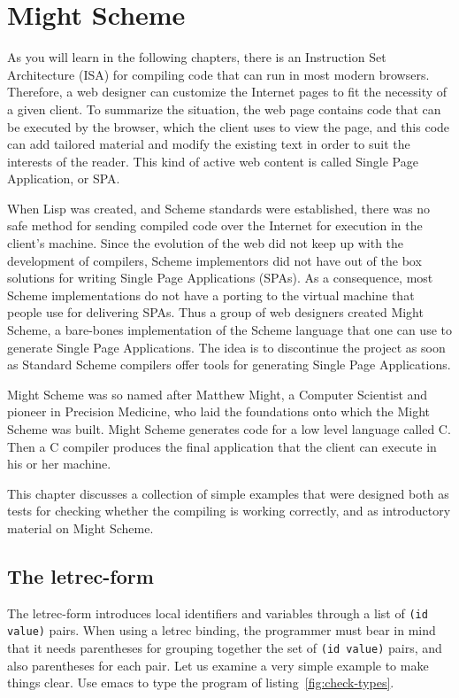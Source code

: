 \documentclass[a4paper,12pt]{book}
\begin{document}
\chapter{Might Scheme}

As you will learn in the following chapters, there is
an Instruction Set Architecture (ISA) for compiling
code that can run in most modern browsers. Therefore,
a web designer can customize the Internet pages to
fit the necessity of a given client. To summarize the
situation, the web page contains code that can be
executed by the browser, which the client uses to view
the page, and this code can add tailored
material and modify the existing text in order to suit
the interests of the reader. This kind of active
web content is called Single Page Application, or SPA.

When Lisp was created, and Scheme standards were established,
there was no safe method for sending compiled code over the
Internet for execution in the client's machine. Since the
evolution of the web did not keep up with the development of
compilers, Scheme implementors did not have out of the box
solutions for writing Single Page Applications (SPAs).
As a consequence, most Scheme implementations do not have
a porting to the virtual machine that people use for delivering
SPAs. Thus a group of web designers created Might Scheme,
a bare-bones implementation of the Scheme language that one
can use to generate Single Page Applications. The idea is to
discontinue the project as soon as Standard Scheme compilers
offer tools for generating Single Page Applications.

Might Scheme was so named after Matthew Might, a Computer Scientist
and pioneer in Precision Medicine, who laid the foundations onto
which the Might Scheme was built. Might Scheme generates code for
a low level language called C. Then a C compiler produces the
final application that the client can execute in his or her machine.

This chapter discusses a collection of simple examples that were
designed both as tests for checking whether the compiling is working
correctly, and as introductory material on Might Scheme.

\section{The letrec-form}

The letrec-form introduces local identifiers
and variables through a list of \verb|(id value)| 
pairs. When using a letrec binding, the programmer must
bear in mind that it needs parentheses for
grouping together the set of \verb|(id value)| pairs,
and also parentheses for each pair. Let us examine
a very simple example to make things clear. Use emacs to
type the program of listing~\ref{fig:check-types}.
\end{document}
